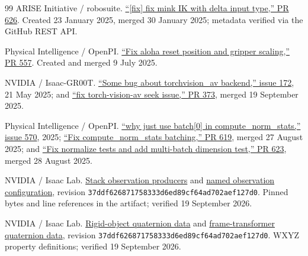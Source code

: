 \documentclass[conference]{IEEEtran}
\begin{document}
\begin{thebibliography}{99}
 ARISE Initiative / robosuite. \href{https://github.com/ARISE-Initiative/robosuite/pull/626}{“[fix] fix mink IK with delta input type,” PR 626}. Created 23 January 2025, merged 30 January 2025; metadata verified via the GitHub REST API.

 Physical Intelligence / OpenPI. \href{https://github.com/Physical-Intelligence/openpi/pull/557}{“Fix aloha reset position and gripper scaling,” PR 557}. Created and merged 9 July 2025.

 NVIDIA / Isaac-GR00T. \href{https://github.com/NVIDIA/Isaac-GR00T/issues/172}{“Some bug about torchvision\_\allowbreak{}av backend,” issue 172}, 21 May 2025; and \href{https://github.com/NVIDIA/Isaac-GR00T/pull/373}{“fix torch-vision-av seek issue,” PR 373}, merged 19 September 2025.

 Physical Intelligence / OpenPI. \href{https://github.com/Physical-Intelligence/openpi/issues/570}{“why just use batch[0] in compute\_\allowbreak{}norm\_\allowbreak{}stats,” issue 570}, 2025; \href{https://github.com/Physical-Intelligence/openpi/pull/619}{“Fix compute\_\allowbreak{}norm\_\allowbreak{}stats batching,” PR 619}, merged 27 August 2025; and \href{https://github.com/Physical-Intelligence/openpi/pull/623}{“Fix normalize tests and add multi-batch dimension test,” PR 623}, merged 28 August 2025.

 NVIDIA / Isaac Lab. \href{https://github.com/isaac-sim/IsaacLab/blob/37ddf626871758333d6ed89cf64ad702aef127d0/source/isaaclab_tasks/isaaclab_tasks/manager_based/manipulation/stack/mdp/observations.py}{Stack observation producers} and \href{https://github.com/isaac-sim/IsaacLab/blob/37ddf626871758333d6ed89cf64ad702aef127d0/source/isaaclab_tasks/isaaclab_tasks/manager_based/manipulation/stack/stack_env_cfg.py\#L78-L93}{named observation configuration}, revision \texttt{37ddf6268717\allowbreak{}58333d6ed89c\allowbreak{}f64ad702aef1\allowbreak{}27d0}. Pinned bytes and line references in the artifact; verified 19 September 2026.

 NVIDIA / Isaac Lab. \href{https://github.com/isaac-sim/IsaacLab/blob/37ddf626871758333d6ed89cf64ad702aef127d0/source/isaaclab/isaaclab/assets/rigid_object/rigid_object_data.py\#L407-L412}{Rigid-object quaternion data} and \href{https://github.com/isaac-sim/IsaacLab/blob/37ddf626871758333d6ed89cf64ad702aef127d0/source/isaaclab/isaaclab/sensors/frame_transformer/frame_transformer_data.py\#L41-L45}{frame-transformer quaternion data}, revision \texttt{37ddf6268717\allowbreak{}58333d6ed89c\allowbreak{}f64ad702aef1\allowbreak{}27d0}. WXYZ property definitions; verified 19 September 2026.


\end{thebibliography}
\end{document}
